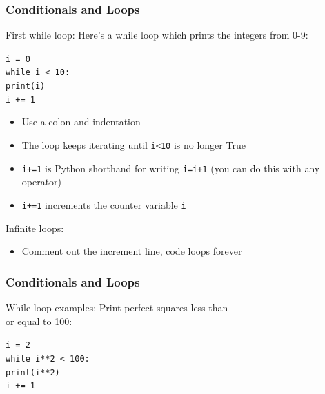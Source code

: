 \documentclass{beamer}
\newcommand{\code}[1]{\texttt{#1}}
\newcommand{\tab}{\hspace*{22pt}}
\begin{document}
\begin{frame}%
	\frametitle{Conditionals and Loops}
	
	\begin{block}{First while loop:}
			Here's a while loop which prints the integers from 0-9: \\
			
			\vspace{10pt}
			
			\code{i = 0 \\
				while i < 10: \\
				\tab print(i) \\
				\tab i += 1}
				
				\vspace{10pt}
		\endminipage\hfill
			\begin{itemize}
				\item Use a colon and indentation
				\item The loop keeps iterating until \code{i<10} is no longer True
				\item \code{i+=1} is Python shorthand for writing \code{i=i+1} (you can do this with any operator)
				\item \code{i+=1} increments the counter variable \code{i}
			\end{itemize}
		\endminipage\hfill
		
		\vspace{1pt}
		
		Infinite loops:
		\begin{itemize}
			\item Comment out the increment line, code loops forever
		\end{itemize}
	\end{block}
	
\end{frame}

\begin{frame}%
	\frametitle{Conditionals and Loops}
	
	\begin{block}{While loop examples:}
			Print perfect squares less than \\ or equal to 100: \\
			
			\vspace{10pt}
			
			\code{i = 2 \\
				while i**2 < 100: \\
				\tab print(i**2) \\
				\tab i += 1}
				
		\endminipage\hfill
			
		\endminipage\hfill
	\end{block}
	
\end{frame}
\end{document}
